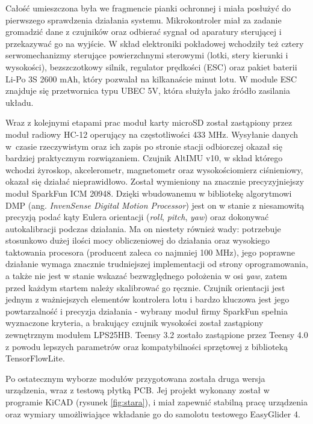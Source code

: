 \documentclass[12pt, a4paper]{article}
\begin{document}
Całość umieszczona była we fragmencie pianki ochronnej i miała posłużyć do pierwszego sprawdzenia działania systemu. Mikrokontroler miał za zadanie gromadzić dane z czujników oraz odbierać sygnał od aparatury sterującej i przekazywać go na wyjście. W skład elektroniki pokładowej wchodziły też cztery serwomechanizmy sterujące powierzchnymi sterowymi (lotki, stery kierunki i wysokości), bezszczotkowy silnik, regulator prędkości (ESC) oraz pakiet baterii Li-Po 3S 2600 mAh, który pozwalał na kilkanaście minut lotu. W module ESC znajduje się przetwornica typu UBEC 5V, która służyła jako źródło zasilania układu.
 
Wraz z kolejnymi etapami prac moduł karty microSD został zastąpiony przez moduł radiowy HC-12 operujący na częstotliwości 433 MHz. Wysyłanie danych w~czasie rzeczywistym oraz ich zapis po stronie stacji odbiorczej okazał się bardziej praktycznym rozwiązaniem. Czujnik AltIMU v10, w skład którego wchodzi żyroskop, akcelerometr, magnetometr oraz wysokościomierz ciśnieniowy, okazał się działać nieprawidłowo. Został wymieniony na znacznie precyzyjniejszy moduł SparkFun ICM 20948. Dzięki wbudowanemu w bibliotekę algorytmowi DMP (ang. \textit{InvenSense Digital Motion Processor}) jest on w stanie z niesamowitą precyzją podać kąty Eulera orientacji (\textit{roll}, \textit{pitch}, \textit{yaw}) oraz dokonywać autokalibracji podczas działania. Ma on niestety również wady: potrzebuje stosunkowo dużej ilości mocy obliczeniowej do działania oraz wysokiego taktowania procesora (producent zaleca co najmniej 100 MHz), jego poprawne działanie wymaga znacznie trudniejszej implementacji od strony oprogramowania, a także nie jest w stanie wskazać bezwzględnego położenia w osi \textit{yaw}, zatem przed każdym startem należy skalibrować go ręcznie. Czujnik orientacji jest jednym z ważniejszych elementów kontrolera lotu i bardzo kluczowa jest jego powtarzalność i precyzja działania - wybrany moduł firmy SparkFun spełnia wyznaczone kryteria, a brakujący czujnik wysokości został zastąpiony zewnętrznym modułem LPS25HB. Teensy 3.2 zostało zastąpione przez Teensy 4.0 z powodu lepszych parametrów oraz kompatybilności sprzętowej z biblioteką TensorFlowLite.

Po ostatecznym wyborze modułów przygotowana została druga wersja urządzenia, wraz  z testową płytką PCB. Jej projekt wykonany został w programie KiCAD (rysunek \ref{fig:stara}), i miał zapewnić stabilną pracę urządzenia oraz wymiary umożliwiające wkładanie go do samolotu testowego EasyGlider 4. 
\end{document}
